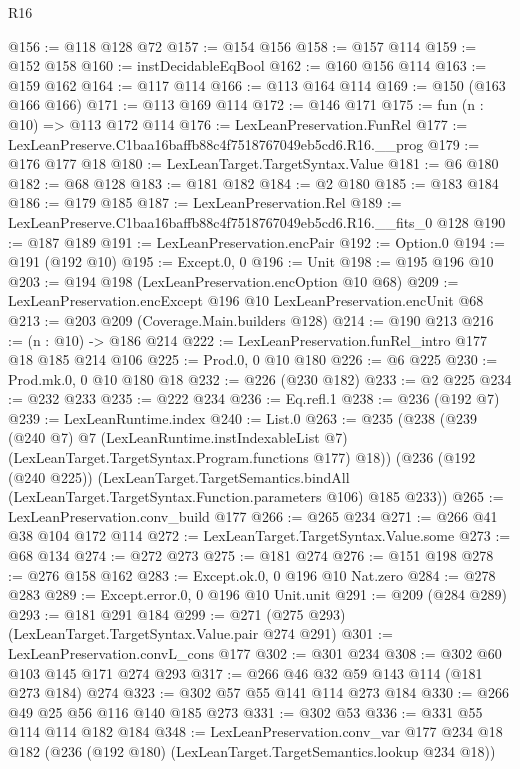 \begin{lexlean}{R16}
\begin{coremodule}
@156 := @118 @128 @72
@157 := @154 @156
@158 := @157 @114
@159 := @152 @158
@160 := instDecidableEqBool
@162 := @160 @156 @114
@163 := @159 @162
@164 := @117 @114
@166 := @113 @164 @114
@169 := @150 (@163 @166 @166)
@171 := @113 @169 @114
@172 := @146 @171
@175 := fun (n : @10) => @113 @172 @114
@176 := LexLeanPreservation.FunRel
@177 := LexLeanPreserve.C1baa16baffb88c4f7518767049eb5cd6.R16.__prog
@179 := @176 @177 @18
@180 := LexLeanTarget.TargetSyntax.Value
@181 := @6 @180
@182 := @68 @128
@183 := @181 @182
@184 := @2 @180
@185 := @183 @184
@186 := @179 @185
@187 := LexLeanPreservation.Rel
@189 := LexLeanPreserve.C1baa16baffb88c4f7518767049eb5cd6.R16.__fits_0 @128
@190 := @187 @189
@191 := LexLeanPreservation.encPair
@192 := Option.{0}
@194 := @191 (@192 @10)
@195 := Except.{0, 0}
@196 := Unit
@198 := @195 @196 @10
@203 := @194 @198 (LexLeanPreservation.encOption @10 @68)
@209 := LexLeanPreservation.encExcept @196 @10 LexLeanPreservation.encUnit @68
@213 := @203 @209 (Coverage.Main.builders @128)
@214 := @190 @213
@216 := (n : @10) -> @186 @214
@222 := LexLeanPreservation.funRel_intro @177 @18 @185 @214 @106
@225 := Prod.{0, 0} @10 @180
@226 := @6 @225
@230 := Prod.mk.{0, 0} @10 @180 @18
@232 := @226 (@230 @182)
@233 := @2 @225
@234 := @232 @233
@235 := @222 @234
@236 := Eq.refl.{1}
@238 := @236 (@192 @7)
@239 := LexLeanRuntime.index
@240 := List.{0}
@263 := @235
    (@238
      (@239
        (@240 @7)
        @7
        (LexLeanRuntime.instIndexableList @7)
        (LexLeanTarget.TargetSyntax.Program.functions @177)
        @18))
    (@236
      (@192 (@240 @225))
      (LexLeanTarget.TargetSemantics.bindAll
        (LexLeanTarget.TargetSyntax.Function.parameters @106)
        @185
        @233))
@265 := LexLeanPreservation.conv_build @177
@266 := @265 @234
@271 := @266 @41 @38 @104 @172 @114
@272 := LexLeanTarget.TargetSyntax.Value.some
@273 := @68 @134
@274 := @272 @273
@275 := @181 @274
@276 := @151 @198
@278 := @276 @158 @162
@283 := Except.ok.{0, 0} @196 @10 Nat.zero
@284 := @278 @283
@289 := Except.error.{0, 0} @196 @10 Unit.unit
@291 := @209 (@284 @289)
@293 := @181 @291 @184
@299 := @271 (@275 @293) (LexLeanTarget.TargetSyntax.Value.pair @274 @291)
@301 := LexLeanPreservation.convL_cons @177
@302 := @301 @234
@308 := @302 @60 @103 @145 @171 @274 @293
@317 := @266 @46 @32 @59 @143 @114 (@181 @273 @184) @274
@323 := @302 @57 @55 @141 @114 @273 @184
@330 := @266 @49 @25 @56 @116 @140 @185 @273
@331 := @302 @53
@336 := @331 @55 @114 @114 @182 @184
@348 := LexLeanPreservation.conv_var
    @177
    @234
    @18
    @182
    (@236 (@192 @180) (LexLeanTarget.TargetSemantics.lookup @234 @18))

\end{coremodule}
\end{lexlean}
